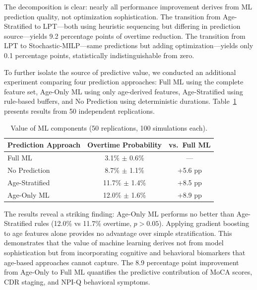 \documentclass[11pt,a4paper]{article}
\begin{document}
The decomposition is clear: nearly all performance improvement derives from ML prediction quality, not optimization sophistication. The transition from Age-Stratified to LPT---both using heuristic sequencing but differing in prediction source---yields 9.2 percentage points of overtime reduction. The transition from LPT to Stochastic-MILP---same predictions but adding optimization---yields only 0.1 percentage points, statistically indistinguishable from zero.

To further isolate the source of predictive value, we conducted an additional experiment comparing four prediction approaches: Full ML using the complete feature set, Age-Only ML using only age-derived features, Age-Stratified using rule-based buffers, and No Prediction using deterministic durations. Table~\ref{tab:ml_value} presents results from 50 independent replications.


\begin{table}[H]
\centering
\caption{Value of ML components (50 replications, 100 simulations each). }
\label{tab:ml_value}
\begin{tabular}{@{}lcc@{}}
\toprule
\textbf{Prediction Approach} & \textbf{Overtime Probability} & \textbf{vs.\ Full ML} \\
\midrule
Full ML & 3.1\% $\pm$ 0.6\% & --- \\
No Prediction & 8.7\% $\pm$ 1.1\% & +5.6 pp \\
Age-Stratified & 11.7\% $\pm$ 1.4\% & +8.5 pp \\
Age-Only ML & 12.0\% $\pm$ 1.6\% & +8.9 pp \\
\bottomrule
\end{tabular}
\end{table}

The results reveal a striking finding: Age-Only ML performs no better than Age-Stratified rules (12.0\% vs 11.7\% overtime, $p > 0.05$). Applying gradient boosting to age features alone provides no advantage over simple stratification. This demonstrates that the value of machine learning derives not from model sophistication but from incorporating cognitive and behavioral biomarkers that age-based approaches cannot capture. The 8.9 percentage point improvement from Age-Only to Full ML quantifies the predictive contribution of MoCA scores, CDR staging, and NPI-Q behavioral symptoms.
\end{document}
